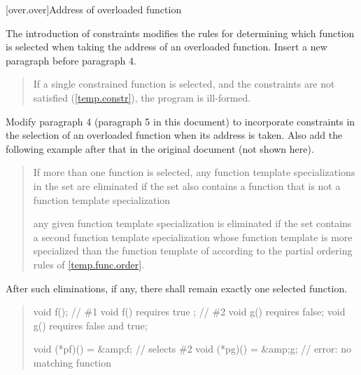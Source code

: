 [over.over]{Address of overloaded function}

The introduction of constraints modifies the rules for determining
which function is selected when taking the address of an overloaded
function. Insert a new paragraph before paragraph 4.

\begin{quote}
\setcounter{Paras}{3}
\pnum
If a single constrained function is selected, and the constraints are
not satisfied (\ref{temp.constr}), the program
is ill-formed. 
\end{quote}

Modify paragraph 4 (paragraph 5 in this document) to incorporate 
constraints in the selection of an overloaded function when its address is 
taken. Also add the following example after that in the original document 
(not shown here).

\begin{quote}
\pnum
If more than one function is selected, any function template 
specializations in the set are eliminated if the set also contains a 
function that is not a function template 
specialization

 any given function template specialization
 is eliminated if the set contains a second function 
template specialization whose function template is more specialized than 
the function template of  according to the partial ordering 
rules of \ref{temp.func.order}.
\end{quote}

After such eliminations, if any, there shall remain exactly one 
selected function.

\begin{quote}
\enterexample
\begin{codeblock}
void f();                // \#1
void f() requires true ; // \#2
void g() requires false;
void g() requires false and true;

void (*pf)() = &amp;f;         // selects \#2
void (*pg)() = &amp;g;         // error: no matching function
\end{codeblock}
\exitexample
\end{quote}
